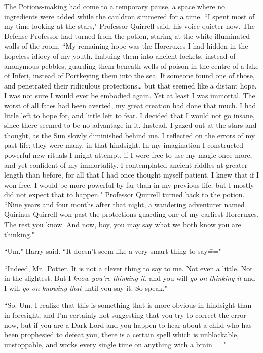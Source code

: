 The Potions-making had come to a temporary pause, a space where no ingredients were added while the cauldron simmered for a time. ``I spent most of my time looking at the stars," Professor Quirrell said, his voice quieter now. The Defense Professor had turned from the potion, staring at the white-illuminated walls of the room. ``My remaining hope was the Horcruxes I had hidden in the hopeless idiocy of my youth. Imbuing them into ancient lockets, instead of anonymous pebbles; guarding them beneath wells of poison in the centre of a lake of Inferi, instead of Portkeying them into the sea. If someone found one of those, and penetrated their ridiculous protections{\ldots} but that seemed like a distant hope. I was not sure I would ever be embodied again. Yet at least I was immortal. The worst of all fates had been averted, my great creation had done that much. I had little left to hope for, and little left to fear. I decided that I would not go insane, since there seemed to be no advantage in it. Instead, I gazed out at the stars and thought, as the Sun slowly diminished behind me. I reflected on the errors of my past life; they were many, in that hindsight. In my imagination I constructed powerful new rituals I might attempt, if I were free to use my magic once more, and yet confident of my immortality. I contemplated ancient riddles at greater length than before, for all that I had once thought myself patient. I knew that if I won free, I would be more powerful by far than in my previous life; but I mostly did not expect that to happen." Professor Quirrell turned back to the potion. ``Nine years and four months after that night, a wandering adventurer named Quirinus Quirrell won past the protections guarding one of my earliest Horcruxes. The rest you know. And now, boy, you may say what we both know you are thinking."

``Um," Harry said. ``It doesn't seem like a very smart thing to say\==="

``Indeed, Mr.~Potter. It is not a clever thing to say to me. Not even a little. Not in the slightest. But I \emph{know you're thinking it}, and you will \emph{go on thinking it} and I will \emph{go on knowing that} until you say it. So speak."

``So. Um. I realize that this is something that is more obvious in hindsight than in foresight, and I'm certainly not suggesting that you try to correct the error now, but if you are a Dark Lord and you happen to hear about a child who has been prophesied to defeat you, there is a certain spell which is unblockable, unstoppable, and works every single time on anything with a brain\==="

